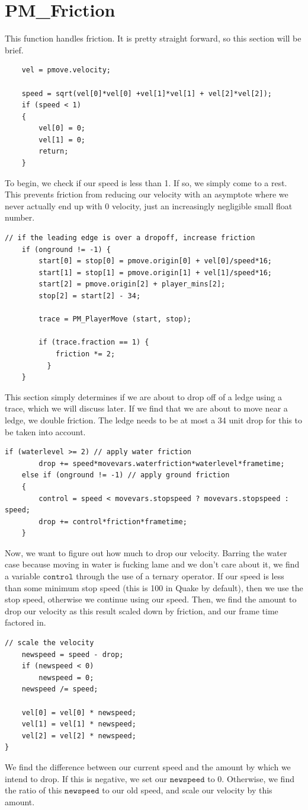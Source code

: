 \documentclass{article}
\begin{document}
\section{PM\_Friction}
This function handles friction. It is pretty straight forward, so this section will be brief.
\begin{verbatim}
	vel = pmove.velocity;
	
	speed = sqrt(vel[0]*vel[0] +vel[1]*vel[1] + vel[2]*vel[2]);
	if (speed < 1)
	{
		vel[0] = 0;
		vel[1] = 0;
		return;
	}
\end{verbatim}
To begin, we check if our speed is less than 1. If so, we simply come to a rest. This prevents friction from reducing our velocity with an asymptote where we never actually end up with 0 velocity, just an increasingly negligible small float number.
\begin{verbatim}
// if the leading edge is over a dropoff, increase friction
	if (onground != -1) {
		start[0] = stop[0] = pmove.origin[0] + vel[0]/speed*16;
		start[1] = stop[1] = pmove.origin[1] + vel[1]/speed*16;
		start[2] = pmove.origin[2] + player_mins[2];
		stop[2] = start[2] - 34;

		trace = PM_PlayerMove (start, stop);

		if (trace.fraction == 1) {
			friction *= 2;
		  }
    }
\end{verbatim}
This section simply determines if we are about to drop off of a ledge using a trace, which we will discuss later. If we find that we are about to move near a ledge, we double friction. The ledge needs to be at most a 34 unit drop for this to be taken into account.
\begin{verbatim}
if (waterlevel >= 2) // apply water friction
		drop += speed*movevars.waterfriction*waterlevel*frametime;
	else if (onground != -1) // apply ground friction
	{
		control = speed < movevars.stopspeed ? movevars.stopspeed : speed;
		drop += control*friction*frametime;
	}
\end{verbatim}
Now, we want to figure out how much to drop our velocity. Barring the water case because moving in water is fucking lame and we don't care about it, we find a variable $\texttt{control}$ through the use of a ternary operator. If our speed is less than some minimum stop speed (this is 100 in Quake by default), then we use the stop speed, otherwise we continue using our speed. Then, we find the amount to drop our velocity as this result scaled down by friction, and our frame time factored in. 
\begin{verbatim}
// scale the velocity
	newspeed = speed - drop;
	if (newspeed < 0)
		newspeed = 0;
	newspeed /= speed;

	vel[0] = vel[0] * newspeed;
	vel[1] = vel[1] * newspeed;
	vel[2] = vel[2] * newspeed;
}
\end{verbatim}
We find the difference between our current speed and the amount by which we intend to drop. If this is negative, we set our $\texttt{newspeed}$ to 0. Otherwise, we find the ratio of this $\texttt{newspeed}$ to our old speed, and scale our velocity by this amount.
\newpage
\end{document}
